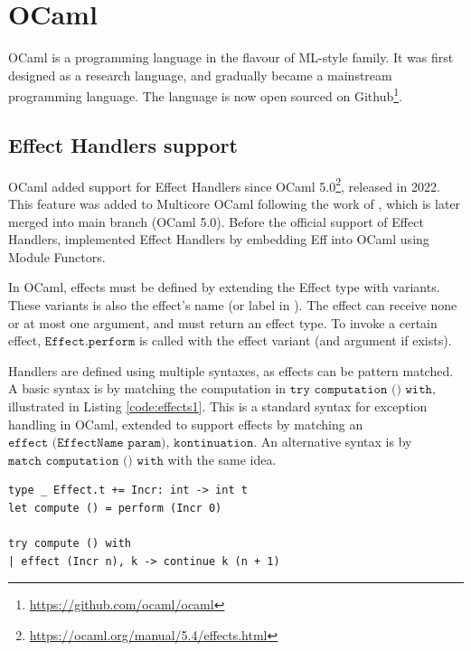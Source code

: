 \chapter{OCaml}
\label{chap:ocaml}

OCaml is a programming language in the flavour of ML-style family. It was first designed as a research language, and gradually became a mainstream programming language. The language is now open sourced on Github\footnote{\href{https://github.com/ocaml/ocaml}{https://github.com/ocaml/ocaml}}.

\section{Effect Handlers support}

OCaml added support for Effect Handlers since OCaml 5.0\footnote{\href{https://ocaml.org/manual/5.4/effects.html}{https://ocaml.org/manual/5.4/effects.html}}, released in 2022. This feature was added to Multicore OCaml following the work of \cite{sivaramakrishnan2021retrofitting}, which is later merged into main branch (OCaml 5.0). Before the official support of Effect Handlers, \cite{kiselyov2018eff} implemented Effect Handlers by embedding Eff into OCaml using Module Functors.

In OCaml, effects must be defined by extending the Effect type with variants. These variants is also the effect's name (or label in \lange). The effect can receive none or at most one argument, and must return an effect type. To invoke a certain effect, $\texttt{Effect.perform}$ is called with the effect variant (and argument if exists).

Handlers are defined using multiple syntaxes, as effects can be pattern matched. A basic syntax is by matching the computation in $\texttt{try computation () with}$, illustrated in Listing \ref{code:effects1}. This is a standard syntax for exception handling in OCaml, extended to support effects by matching an $\texttt{effect (EffectName param), kontinuation}$. An alternative syntax is by $\texttt{match computation () with}$ with the same idea.

\begin{listing}
\begin{verbatim}
type _ Effect.t += Incr: int -> int t
let compute () = perform (Incr 0)

try compute () with
| effect (Incr n), k -> continue k (n + 1)
\end{verbatim}
\caption{OCaml effects handler extended by exception handler}
\label{code:effects1}
\end{listing}

